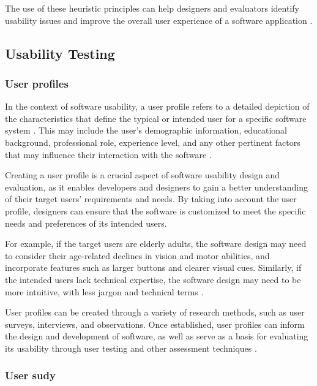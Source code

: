 \documentclass[conference,onecolumn]{IEEEtran}
\begin{document}
        The use of these heuristic principles can help designers and evaluators identify usability issues and improve the overall user experience of a software application \cite{nielsen1994heuristic}.

    \subsection{Usability Testing}
        
        \subsubsection{User profiles}\hfill

            In the context of software usability, a user profile refers to a detailed depiction of the characteristics that define the typical or intended user for a specific software system \cite{molich1990improving}. This may include the user's demographic information, educational background, professional role, experience level, and any other pertinent factors that may influence their interaction with the software \cite{molich1990improving}.

            Creating a user profile is a crucial aspect of software usability design and evaluation, as it enables developers and designers to gain a better understanding of their target users' requirements and needs. By taking into account the user profile, designers can ensure that the software is customized to meet the specific needs and preferences of its intended users\cite{rubin2008handbook}.

            For example, if the target users are elderly adults, the software design may need to consider their age-related declines in vision and motor abilities, and incorporate features such as larger buttons and clearer visual cues. Similarly, if the intended users lack technical expertise, the software design may need to be more intuitive, with less jargon and technical terms \cite{virzi1992refining}.

            User profiles can be created through a variety of research methods, such as user surveys, interviews, and observations. Once established, user profiles can inform the design and development of software, as well as serve as a basis for evaluating its usability through user testing and other assessment techniques \cite{albert2013measuring}.

        \subsubsection{User sudy}\hfill
\end{document}
